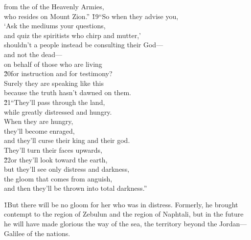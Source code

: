 \begin{poetry}
\poemll    from the  of the Heavenly Armies, \\
\poemlll       who resides on Mount Zion.''
\poeml \v{19}``So when they advise you, \\
\poeml `Ask the mediums your questions, \\
\poemll    and quiz the spiritists who chirp and mutter,' \\
\poeml shouldn't a people instead be consulting their God--- \\
\poemll    and not the dead--- \\
\poeml on behalf of those who are living \\
\poeml \v{20}for instruction and for testimony? \\
\poemll    Surely they are speaking like this \\
\poemlll       because the truth hasn't dawned on them. \\
\poeml \v{21}``They'll pass through the land, \\
\poemll    while greatly distressed and hungry. \\
\poeml When they are hungry, \\
\poemll    they'll become enraged, \\
\poeml and they'll curse their king and their god. \\
\poemll    They'll turn their faces upwards, \\
\poeml \v{22}or they'll look toward the earth, \\
\poemll    but they'll see only distress and darkness, \\
\poeml the gloom that comes from anguish, \\
\poemll    and then they'll be thrown into total darkness.''
\end{poetry}

\v{1}But there will be no gloom for her who was in distress. Formerly, he brought contempt to the region of Zebulun and the region of Naphtali, but in the future he will have made glorious the way of the sea, the territory beyond the Jordan---Galilee of the nations.

